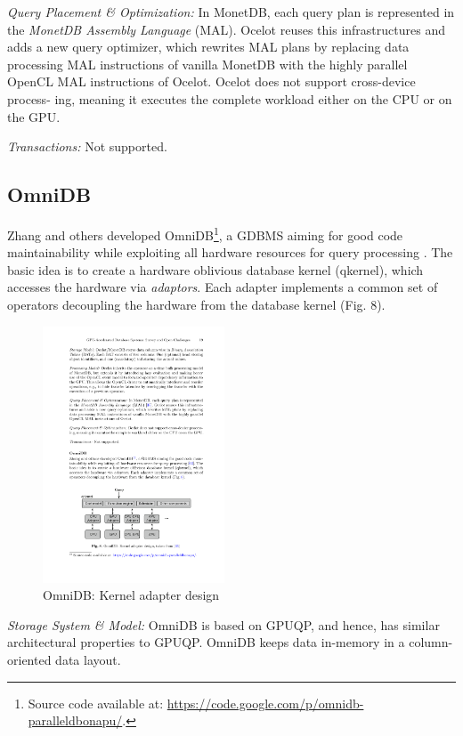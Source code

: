 \documentclass[twocolumn]{article}
\begin{document}
\noindent
\textit{Query Placement \& Optimization:} 
In MonetDB, each query plan is represented in the \textit{MonetDB Assembly Language} (MAL). Ocelot reuses this infrastructures and adds a new query optimizer, which rewrites MAL plans by replacing data processing MAL instructions of vanilla MonetDB with the highly parallel OpenCL MAL instructions of Ocelot.
Ocelot does not support cross-device process- ing, meaning it executes the complete workload either on the CPU or on the GPU.

\noindent
\textit{Transactions:} Not supported.

\subsection{OmniDB}
Zhang and others developed OmniDB\footnote{Source code available at: \href{https://code.google.com/p/omnidb-paralleldbonapu/}{https://code.google.com/p/omnidb-paralleldbonapu/}.}, a GDBMS aiming for good code maintainability while exploiting all hardware resources for query processing \cite{Zhang:2013}. 
The basic idea is to create a hardware oblivious database kernel (qkernel), which accesses the hardware via \textit{adaptors}. Each adapter implements a common set of operators decoupling the hardware from the database kernel (Fig. 8).
\begin{figure}[htb]
        \centering
        \includegraphics[width=0.48\textwidth]{omnidb.pdf}
        \caption{OmniDB: Kernel adapter design}
        \label{fig:omnidb}
\end{figure}

\noindent
\textit{Storage System \& Model:} 
OmniDB is based on GPUQP, and hence, has similar architectural properties to GPUQP. 
OmniDB keeps data in-memory in a column- oriented data layout.
\end{document}
